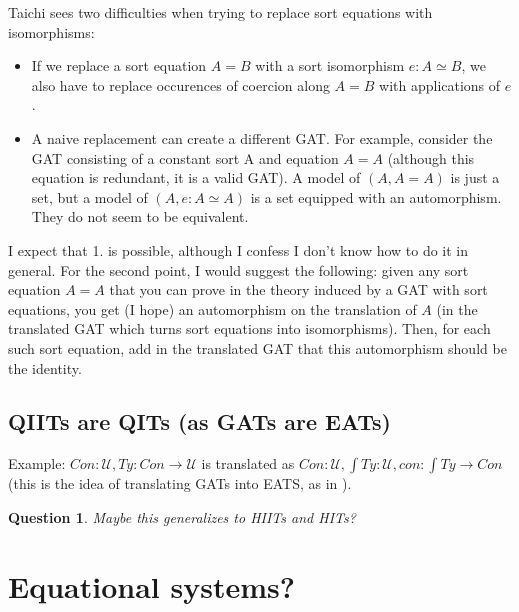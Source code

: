 \documentclass{article}
\newcommand{\U}{\mathcal{U}}
\newtheorem{question}[theorem]{Question}
\begin{document}
Taichi sees two difficulties when trying to replace sort
equations with isomorphisms:
\begin{itemize}
\item If we replace a sort equation $A = B$ with a sort isomorphism $e : A \simeq B$, we also have to replace occurences of coercion along $A = B$ with
  applications of $e$.
  \item A naive replacement can create a different GAT. For
  example, consider the GAT consisting of a constant sort A and equation $A = A$
  (although this equation is redundant, it is a valid GAT). A model of
  $(A, A = A)$ is just a set, but a model of $(A, e : A \simeq A)$ is a set equipped with an
  automorphism. They do not seem to be equivalent.
\end{itemize}
I expect that 1. is possible, although I confess I don't know how to
do it in general.
For the second point, I would suggest the
following: given any sort equation $A = A$ that you can prove in the
theory induced by a GAT with sort equations, you get (I hope) an
automorphism on the translation of $A$ (in the translated GAT which
turns sort equations into isomorphisms). Then,  for each such sort
equation, add in the translated GAT that this automorphism should be
the identity.
\subsection{QIITs are QITs (as GATs are EATs)}
Example:
$Con:\U, Ty:Con\to\U$ is translated as $ Con:\U,\int Ty : \U, con : \int Ty\to
Con$ (this is the idea of translating GATs into EATS, as in \cite{CARTMELL}).
\begin{question}
  Maybe this generalizes to HIITs and HITs?
\end{question}
\section{Equational systems?}


\end{document}
